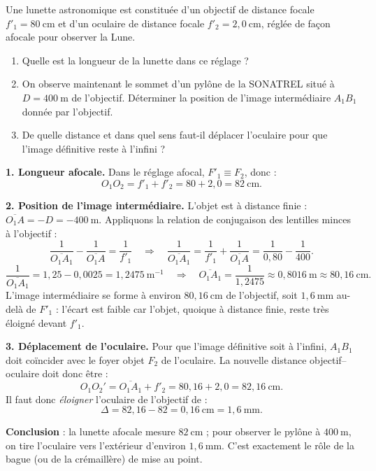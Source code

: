 \documentclass[11pt]{article}
\begin{document}
\begin{exoresolu}
Une lunette astronomique est constituée d'un objectif de distance focale $f'_1 = 80\ \text{cm}$ et d'un oculaire de distance focale $f'_2 = 2,0\ \text{cm}$, réglée de façon afocale pour observer la Lune.
\begin{enumerate}
\item Quelle est la longueur de la lunette dans ce réglage ?
\item On observe maintenant le sommet d'un pylône de la SONATREL situé à $D = 400\ \text{m}$ de l'objectif. Déterminer la position de l'image intermédiaire $A_1B_1$ donnée par l'objectif.
\item De quelle distance et dans quel sens faut-il déplacer l'oculaire pour que l'image définitive reste à l'infini ?
\end{enumerate}
\tcblower
\textbf{1. Longueur afocale.} Dans le réglage afocal, $F'_1 \equiv F_2$, donc :
\[ O_1O_2 = f'_1 + f'_2 = 80 + 2,0 = 82\ \text{cm}. \]

\textbf{2. Position de l'image intermédiaire.} L'objet est à distance finie : $\overline{O_1A} = -D = -400\ \text{m}$. Appliquons la relation de conjugaison des lentilles minces à l'objectif :
\[ \dfrac{1}{\overline{O_1A_1}} - \dfrac{1}{\overline{O_1A}} = \dfrac{1}{f'_1}
\quad\Longrightarrow\quad
\dfrac{1}{\overline{O_1A_1}} = \dfrac{1}{f'_1} + \dfrac{1}{\overline{O_1A}} = \dfrac{1}{0,80} - \dfrac{1}{400}. \]
\[ \dfrac{1}{\overline{O_1A_1}} = 1,25 - 0,0025 = 1,2475\ \text{m}^{-1}
\quad\Longrightarrow\quad
\overline{O_1A_1} = \dfrac{1}{1,2475} \approx 0,8016\ \text{m} \approx 80,16\ \text{cm}. \]
L'image intermédiaire se forme à environ $80,16\ \text{cm}$ de l'objectif, soit $1,6\ \text{mm}$ au-delà de $F'_1$ : l'écart est faible car l'objet, quoique à distance finie, reste très éloigné devant $f'_1$.

\textbf{3. Déplacement de l'oculaire.} Pour que l'image définitive soit à l'infini, $A_1B_1$ doit coïncider avec le foyer objet $F_2$ de l'oculaire. La nouvelle distance objectif--oculaire doit donc être :
\[ O_1O_2' = \overline{O_1A_1} + f'_2 = 80,16 + 2,0 = 82,16\ \text{cm}. \]
Il faut donc \emph{éloigner} l'oculaire de l'objectif de :
\[ \Delta = 82,16 - 82 = 0,16\ \text{cm} = 1,6\ \text{mm}. \]

\textbf{Conclusion} : la lunette afocale mesure $82\ \text{cm}$ ; pour observer le pylône à $400\ \text{m}$, on tire l'oculaire vers l'extérieur d'environ $1,6\ \text{mm}$. C'est exactement le rôle de la bague (ou de la crémaillère) de mise au point.
\end{exoresolu}
\end{document}

